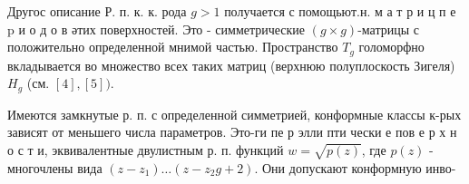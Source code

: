 \documentclass[10pt]{article}
\begin{document}
Другос описание Р. п. к. к. рода $g>1$ получается с помощьют.н. м а т р и ц п е $\mathrm{p}$ и о д о в әтих поверхностей. Это - симметрические $(g \times g)$-матрицы с положительно определенной мнимой частью. Пространство $T_{g}$ голоморфно вкладывается во множество всех таких матриц (верхнюю полуплоскость Зигеля) $H_{g}$ (см. $[4],[5])$.



Имеются замкнутые р. п. с определенной симметрией, конформные классы к-рых зависят от меньшего числа параметров. Это-ги пе р элли пти чески е пов е р х н о с т и, эквивалентные двулистным р. п. функций $w=\sqrt{p(z)}$, где $p(z)$ - многочлены вида $\left(z-z_{1}\right) \ldots\left(z-z_{2} g+2\right)$. Они допускают конформную инво-
\end{document}
